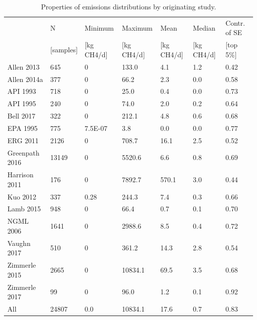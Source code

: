 \documentclass[11pt]{report}
\begin{document}
\begin{table}
\begin{scriptsize}
\caption{Properties of emissions distributions by originating study.}
\label{tab:emission_dist_study}
\begin{tabular*}{1\columnwidth}{llllllp{}}
\toprule
			& N              & Minimum               & Maximum            & Mean           & Median         & Contr. of SE                                \\
              		& {[}samples{]} & {[}kg CH4/d{]} & {[}kg CH4/d{]} & {[}kg CH4/d{]} & {[}kg CH4/d{]}                   & {[}top 5\%{]} \\
		\midrule
Allen 2013     & 645   & 0           & 133.0   & 4.1    & 1.2                  & 0.42 \\
Allen 2014a    & 377   & 0           & 66.2    & 2.3    & 0.0                  & 0.58 \\
API 1993       & 718   & 0           & 25.0    & 0.4    & 0.0                  & 0.73 \\
API 1995       & 240   & 0           & 74.0    & 2.0    & 0.2                  & 0.64 \\
Bell 2017      & 322   & 0           & 212.1   & 4.8    & 0.6                  & 0.68 \\
EPA 1995       & 775   & 7.5E-07    & 3.8     & 0.0    & 0.0                  & 0.77 \\
ERG 2011       & 2126  & 0           & 708.7   & 16.1   & 2.5                  & 0.52 \\
Greenpath 2016 & 13149 & 0           & 5520.6  & 6.6    & 0.8                  & 0.69 \\
Harrison 2011  & 176   & 0           & 7892.7  & 570.1  & 3.0                  & 0.44 \\
Kuo 2012       & 337   & 0.28 & 244.3   & 7.4    & 0.3                  & 0.66 \\
Lamb 2015      & 948   & 0           & 66.4    & 0.7    & 0.1                  & 0.70 \\
NGML 2006      & 1641  & 0           & 2988.6  & 8.5    & 0.4                  & 0.72 \\
Vaughn 2017    & 510   & 0           & 361.2   & 14.3   & 2.8                  & 0.54 \\
Zimmerle 2015  & 2665  & 0           & 10834.1 & 69.5   & 3.5                  & 0.68 \\
Zimmerle 2017  & 99    & 0           & 96.0    & 1.2    & 0.1                  & 0.92 \\
All            		& 24807             & 0.0            & 10834.1        & 17.6           & 0.7                              & 0.83                         \\
\bottomrule
\end{tabular*}
\end{scriptsize}
\end{table}
\end{document}
